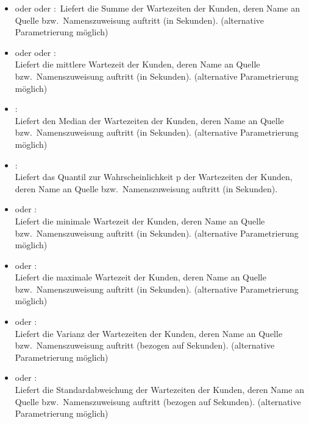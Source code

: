 \begin{itemize}

\item
{} oder  oder :\
Liefert die Summe der Wartezeiten der Kunden, deren Name an Quelle bzw.\ Namenszuweisung  auftritt (in Sekunden).
(alternative Parametrierung möglich)

\item
{} oder  oder :\\
Liefert die mittlere Wartezeit der Kunden, deren Name an Quelle bzw.\ Namenszuweisung \cm{id} auftritt (in Sekunden).
(alternative Parametrierung möglich)

\item
{}:\\
Liefert den Median der Wartezeiten der Kunden, deren Name an Quelle bzw.\ Namenszuweisung  auftritt (in Sekunden).
(alternative Parametrierung möglich)

\item
{}:\\
Liefert das Quantil zur Wahrscheinlichkeit p der Wartezeiten der Kunden, deren Name an Quelle bzw.\ Namenszuweisung  auftritt (in Sekunden).

\item
{} oder :\\
Liefert die minimale Wartezeit der Kunden, deren Name an Quelle bzw.\ Namenszuweisung  auftritt (in Sekunden).
(alternative Parametrierung möglich)

\item
{} oder :\\
Liefert die maximale Wartezeit der Kunden, deren Name an Quelle bzw.\ Namenszuweisung  auftritt (in Sekunden).
(alternative Parametrierung möglich)

\item
{} oder :\\
Liefert die Varianz der Wartezeiten der Kunden, deren Name an Quelle bzw.\ Namenszuweisung  auftritt (bezogen auf Sekunden).
(alternative Parametrierung möglich)

\item
{} oder :\\
Liefert die Standardabweichung der Wartezeiten der Kunden, deren Name an Quelle bzw.\ Namenszuweisung  auftritt (bezogen auf Sekunden).
(alternative Parametrierung möglich)


\end{itemize}
